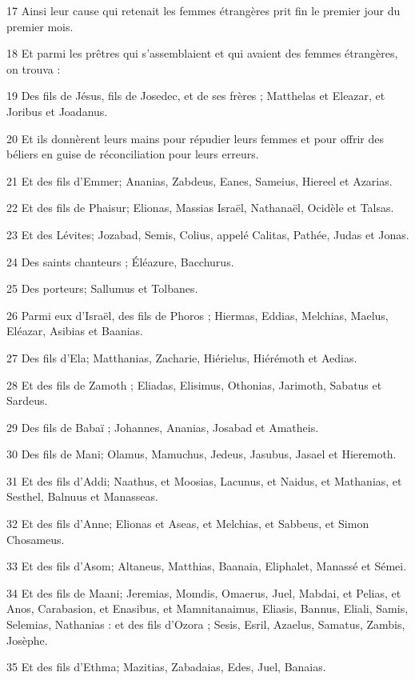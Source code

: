 \par 17 Ainsi leur cause qui retenait les femmes étrangères prit fin le premier jour du premier mois.
\par 18 Et parmi les prêtres qui s'assemblaient et qui avaient des femmes étrangères, on trouva :
\par 19 Des fils de Jésus, fils de Josedec, et de ses frères ; Matthelas et Eleazar, et Joribus et Joadanus.
\par 20 Et ils donnèrent leurs mains pour répudier leurs femmes et pour offrir des béliers en guise de réconciliation pour leurs erreurs.
\par 21 Et des fils d'Emmer; Ananias, Zabdeus, Eanes, Sameius, Hiereel et Azarias.
\par 22 Et des fils de Phaisur; Elionas, Massias Israël, Nathanaël, Ocidèle et Talsas.
\par 23 Et des Lévites; Jozabad, Semis, Colius, appelé Calitas, Pathée, Judas et Jonas.
\par 24 Des saints chanteurs ; Éléazure, Bacchurus.
\par 25 Des porteurs; Sallumus et Tolbanes.
\par 26 Parmi eux d'Israël, des fils de Phoros ; Hiermas, Eddias, Melchias, Maelus, Eléazar, Asibias et Baanias.
\par 27 Des fils d'Ela; Matthanias, Zacharie, Hiérielus, Hiérémoth et Aedias.
\par 28 Et des fils de Zamoth ; Eliadas, Elisimus, Othonias, Jarimoth, Sabatus et Sardeus.
\par 29 Des fils de Babaï ; Johannes, Ananias, Josabad et Amatheis.
\par 30 Des fils de Mani; Olamus, Mamuchus, Jedeus, Jasubus, Jasael et Hieremoth.
\par 31 Et des fils d'Addi; Naathus, et Moosias, Lacunus, et Naidus, et Mathanias, et Sesthel, Balnuus et Manasseas.
\par 32 Et des fils d'Anne; Elionas et Aseas, et Melchias, et Sabbeus, et Simon Chosameus.
\par 33 Et des fils d'Asom; Altaneus, Matthias, Baanaia, Eliphalet, Manassé et Sémei.
\par 34 Et des fils de Maani; Jeremias, Momdis, Omaerus, Juel, Mabdai, et Pelias, et Anos, Carabasion, et Enasibus, et Mamnitanaimus, Eliasis, Bannus, Eliali, Samis, Selemias, Nathanias : et des fils d'Ozora ; Sesis, Esril, Azaelus, Samatus, Zambis, Josèphe.
\par 35 Et des fils d'Ethma; Mazitias, Zabadaias, Edes, Juel, Banaias.
